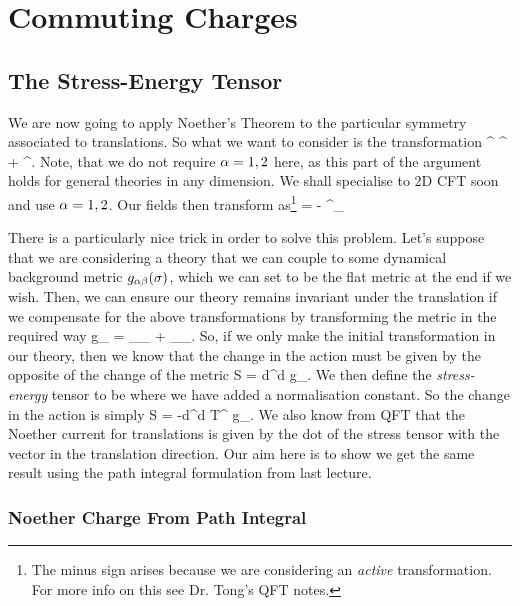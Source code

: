 \chapter{Commuting Charges}

\section{The Stress-Energy Tensor}

We are now going to apply Noether's Theorem to the particular symmetry associated to translations. So what we want to consider is the transformation
\bse 
    \sig^{\a} \to \sig^{\a} + \epsilon^{\a}.
\ese
Note, that we do not require $\alpha=1,2$ here, as this part of the argument holds for general theories in any dimension. We shall specialise to 2D CFT soon and use $\alpha=1,2$. Our fields then transform as\footnote{The minus sign arises because we are considering an \textit{active} transformation. For more info on this see Dr. Tong's QFT notes.} 
\bse 
    \del \phi = - \epsilon^{\a}\p_{\a} \phi
\ese

There is a particularly nice trick in order to solve this problem. Let's suppose that we are considering a theory that we can couple to some dynamical background metric $g_{\alpha\beta}(\sigma)$, which we can set to be the flat metric at the end if we wish. Then, we can ensure our theory remains invariant under the translation if we compensate for the above transformations by transforming the metric in the required way
\bse 
    \del g_{\a\beta} = \nabla_{\a}\epsilon_{\beta} + \nabla_{\beta}\epsilon_{\a}.
\ese 
So, if we only make the initial transformation in our theory, then we know that the change in the action must be given by the opposite of the change of the metric
\bse 
    \del S = \int d^d\sig {} \del g_{\a\beta}.
\ese 
We then define the \textit{stress-energy} tensor to be 
\noindent where we have added a normalisation constant. So the change in the action is simply
\bse 
    \del S = -\int d^d\sig {} T^{\a\beta} \del g_{\a\beta}.
\ese 
We also know from QFT that the Noether current for translations is given by the dot of the stress tensor with the vector in the translation direction. Our aim here is to show we get the same result using the path integral formulation from last lecture. 

\subsection{Noether Charge From Path Integral}

